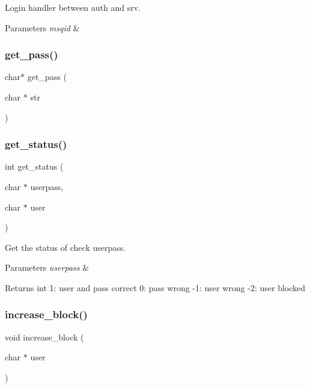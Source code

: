 Login handler between auth and srv. 


\begin{DoxyParams}{Parameters}
{\em msqid} & \\
\hline
\end{DoxyParams}
\mbox{\label{auth_8c_a2e12b8307c78eca77ba679c218546ea9}} 
\subsubsection{get\+\_\+pass()}
{\footnotesize\ttfamily char$\ast$ get\+\_\+pass (\begin{DoxyParamCaption}\item[{char $\ast$}]{str }\end{DoxyParamCaption})}

\mbox{\label{auth_8c_afb230134b9c54844c1d46a4aff308423}} 
\subsubsection{get\+\_\+status()}
{\footnotesize\ttfamily int get\+\_\+status (\begin{DoxyParamCaption}\item[{char $\ast$}]{userpass,  }\item[{char $\ast$}]{user }\end{DoxyParamCaption})}



Get the status of check userpass. 


\begin{DoxyParams}{Parameters}
{\em userpass} & \\
\hline
\end{DoxyParams}
\begin{DoxyReturn}{Returns}
int 1\+: user and pass correct 0\+: pass wrong -\/1\+: user wrong -\/2\+: user blocked 
\end{DoxyReturn}
\mbox{\label{auth_8c_a5477481a6cf3be8d1fea01a8d35ceff2}} 
\subsubsection{increase\+\_\+block()}
{\footnotesize\ttfamily void increase\+\_\+block (\begin{DoxyParamCaption}\item[{char $\ast$}]{user }\end{DoxyParamCaption})}



